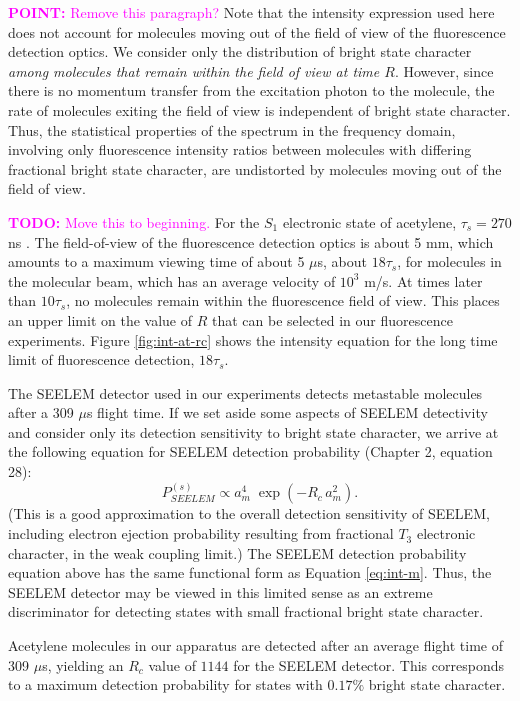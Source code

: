 \documentclass[12pt]{mitthesis}
\newcommand{\TODO} [1]{\textcolor{magenta}{\textbf{TODO:} #1}}
\newcommand{\POINT}[1]{\textcolor{magenta}{\textbf{POINT:} #1}}
\begin{document}
\POINT{Remove this paragraph?}  Note that the intensity expression
used here does not account for molecules moving out of the field of
view of the fluorescence detection optics.  We consider only the
distribution of bright state character \emph{among molecules that
  remain within the field of view at time $R$}.  However, since there
is no momentum transfer from the excitation photon to the molecule,
the rate of molecules exiting the field of view is independent of
bright state character.  Thus, the statistical properties of the
spectrum in the frequency domain, involving only fluorescence
intensity ratios between molecules with differing fractional bright
state character, are undistorted by molecules moving out of the field
of view.

\TODO{Move this to beginning.}  For the $S_1$ electronic state of
acetylene, $\tau_s=270$ ns \cite{ochi91}.  The field-of-view of the
fluorescence detection optics is about 5 mm, which amounts to a
maximum viewing time of about 5 $\mu$s, about $18\tau_s$, for
molecules in the molecular beam, which has an average velocity of
$10^3$ m/s.  At times later than $10\tau_s$, no molecules remain
within the fluorescence field of view.  This places an upper limit on
the value of $R$ that can be selected in our fluorescence experiments.
Figure \ref{fig:int-at-rc} shows the intensity equation for the long
time limit of fluorescence detection, $18\tau_s$.

The SEELEM detector used in our experiments detects metastable
molecules after a 309 $\mu$s flight time.  If we set aside some
aspects of SEELEM detectivity and consider only its detection
sensitivity to bright state character, we arrive at the following
equation for SEELEM detection probability (Chapter 2, equation 28):
\begin{equation}
  \label{eq:seelem-prob-s}
  P_{SEELEM}^{(s)} \propto a_m^4 \; \exp \left( -R_c \, a_m^2 \right).
\end{equation}
(This is a good approximation to the overall detection sensitivity of
SEELEM, including electron ejection probability resulting from
fractional $T_3$ electronic character, in the weak coupling limit.)
The SEELEM detection probability equation above has the same
functional form as Equation \ref{eq:int-m}.  Thus, the SEELEM detector
may be viewed in this limited sense as an extreme discriminator for
detecting states with small fractional bright state character.

Acetylene molecules in our apparatus are detected after an average
flight time of 309 $\mu$s, yielding an $R_c$ value of $1144$ for the
SEELEM detector.  This corresponds to a maximum detection probability
for states with $0.17\%$ bright state character.
\end{document}
